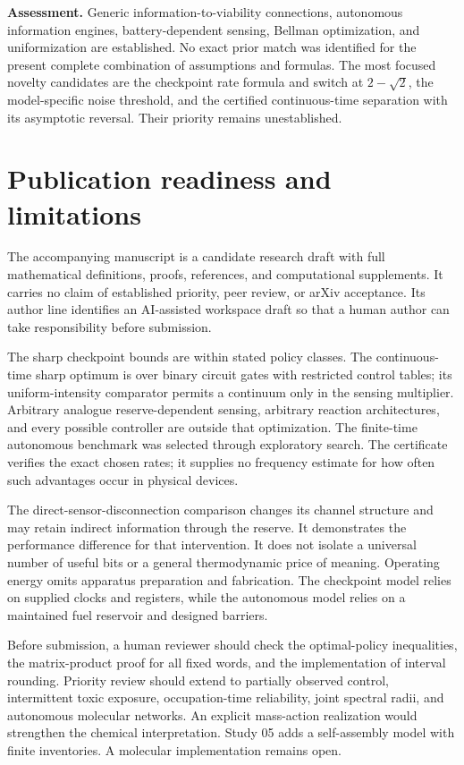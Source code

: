 \documentclass[
  11pt,
]{article}
\begin{document}
\textbf{Assessment.} Generic information-to-viability connections,
autonomous information engines, battery-dependent sensing, Bellman
optimization, and uniformization are established. No exact prior match
was identified for the present complete combination of assumptions and
formulas. The most focused novelty candidates are the checkpoint rate
formula and switch at \(2-\sqrt2\), the model-specific noise threshold,
and the certified continuous-time separation with its asymptotic
reversal. Their priority remains unestablished.

\section{Publication readiness and
limitations}\label{publication-readiness-and-limitations}

The accompanying manuscript is a candidate research draft with full
mathematical definitions, proofs, references, and computational
supplements. It carries no claim of established priority, peer review,
or arXiv acceptance. Its author line identifies an AI-assisted workspace
draft so that a human author can take responsibility before submission.

The sharp checkpoint bounds are within stated policy classes. The
continuous-time sharp optimum is over binary circuit gates with
restricted control tables; its uniform-intensity comparator permits a
continuum only in the sensing multiplier. Arbitrary analogue
reserve-dependent sensing, arbitrary reaction architectures, and every
possible controller are outside that optimization. The finite-time
autonomous benchmark was selected through exploratory search. The
certificate verifies the exact chosen rates; it supplies no frequency
estimate for how often such advantages occur in physical devices.

The direct-sensor-disconnection comparison changes its channel structure
and may retain indirect information through the reserve. It demonstrates
the performance difference for that intervention. It does not isolate a
universal number of useful bits or a general thermodynamic price of
meaning. Operating energy omits apparatus preparation and fabrication.
The checkpoint model relies on supplied clocks and registers, while the
autonomous model relies on a maintained fuel reservoir and designed
barriers.

Before submission, a human reviewer should check the optimal-policy
inequalities, the matrix-product proof for all fixed words, and the
implementation of interval rounding. Priority review should extend to
partially observed control, intermittent toxic exposure, occupation-time
reliability, joint spectral radii, and autonomous molecular networks. An
explicit mass-action realization would strengthen the chemical
interpretation. Study 05 adds a self-assembly model with finite
inventories. A molecular implementation remains open.
\end{document}
